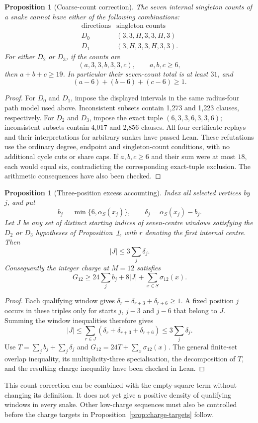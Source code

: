 \documentclass[11pt,a4paper]{article}
\newtheorem{proposition}[theorem]{Proposition}
\theoremstyle{definition}
\theoremstyle{remark}
\begin{document}
\begin{proposition}[Coarse-count correction]\label{prop:coarse-correction}
The seven internal singleton counts of a snake cannot have either of the following combinations:
\[
\begin{array}{c|c}
\text{directions}&\text{singleton counts}\\\hline
D_0&(3,3,H,3,3,H,3)\\
D_1&(3,H,3,3,H,3,3).
\end{array}
\]
For either $D_2$ or $D_3$, if the counts are
\[
(a,3,3,b,3,3,c),\qquad a,b,c\ge6,
\]
then $a+b+c\ge19$. In particular their seven-count total is at least $31$, and
\[
(a-6)+(b-6)+(c-6)\ge1.
\]
\end{proposition}
\begin{proof}
For $D_0$ and $D_1$, impose the displayed intervals in the same radius-four path model used above. Inconsistent subsets contain 1,273 and 1,223 clauses, respectively. For $D_2$ and $D_3$, impose the exact tuple $(6,3,3,6,3,3,6)$; inconsistent subsets contain 4,017 and 2,856 clauses. All four certificate replays and their interpretations for arbitrary snakes have passed Lean. These refutations use the ordinary degree, endpoint and singleton-count conditions, with no additional cycle cuts or share caps. If $a,b,c\ge6$ and their sum were at most $18$, each would equal six, contradicting the corresponding exact-tuple exclusion. The arithmetic consequences have also been checked.
\end{proof}

\begin{proposition}[Three-position excess accounting]\label{prop:three-excess}
Index all selected vertices by $j$, and put
\[
b_j=\min\{6,\alpha_S(x_j)\},\qquad
\delta_j=\alpha_S(x_j)-b_j.
\]
Let $J$ be any set of distinct starting indices of seven-centre windows satisfying the $D_2$ or $D_3$ hypotheses of Proposition~\ref{prop:coarse-correction}, with $r$ denoting the first internal centre. Then
\[
|J|\le3\sum_j\delta_j.
\]
Consequently the integer charge at $M=12$ satisfies
\[
G_{12}\ge24\sum_j b_j+8|J|+\sum_{x\in S}\sigma_{12}(x).
\]
\end{proposition}
\begin{proof}
Each qualifying window gives $\delta_r+\delta_{r+3}+\delta_{r+6}\ge1$. A fixed position $j$ occurs in these triples only for starts $j$, $j-3$ and $j-6$ that belong to $J$. Summing the window inequalities therefore gives
\[
|J|\le\sum_{r\in J}(\delta_r+\delta_{r+3}+\delta_{r+6})
\le3\sum_j\delta_j.
\]
Use $T=\sum_j b_j+\sum_j\delta_j$ and $G_{12}=24T+\sum_x\sigma_{12}(x)$. The general finite-set overlap inequality, its multiplicity-three specialisation, the decomposition of $T$, and the resulting charge inequality have been checked in Lean.
\end{proof}
This count correction can be combined with the empty-square term without changing its definition. It does not yet give a positive density of qualifying windows in every snake. Other low-charge sequences must also be controlled before the charge targets in Proposition~\ref{prop:charge-targets} follow.
\end{document}
